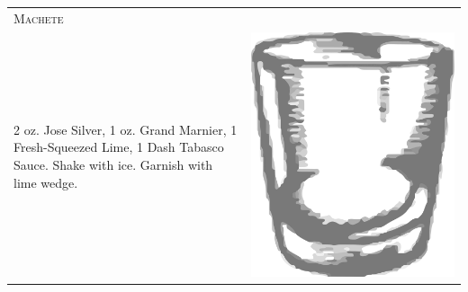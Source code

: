 \documentclass{article}
\begin{document}
\begin{multicols}{2}
\begin{tabular}{p{2in} p{0.5in}}
\multicolumn{2}{p{3in}}{\centering\Huge\textsc{Machete}} \\ 
  \vspace{-0.1in}2 oz. Jose Silver, 1 oz. Grand Marnier, 1 Fresh-Squeezed Lime, 1 Dash Tabasco Sauce. Shake with ice. Garnish with lime wedge. &
  \vspace{-0.1in} \includegraphics{rocks_glass.png}
\end{tabular}
\end{multicols}
\end{document}
